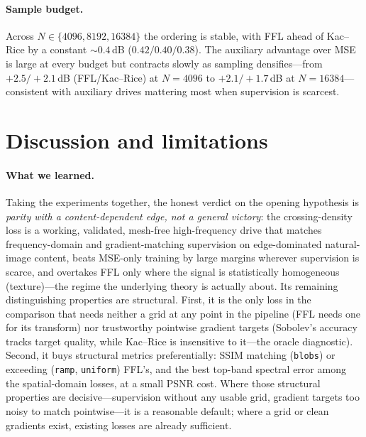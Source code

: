 \documentclass[10pt]{article}
\begin{document}
\paragraph{Sample budget.} Across $N\in\{4096, 8192, 16384\}$ the ordering is stable,
with FFL ahead of Kac--Rice by a constant ${\sim}0.4$\,dB ($0.42/0.40/0.38$). The
auxiliary advantage over MSE is large at every budget but contracts slowly as
sampling densifies---from $+2.5/+2.1$\,dB (FFL/Kac--Rice) at $N{=}4096$ to
$+2.1/+1.7$\,dB at $N{=}16384$---consistent with auxiliary drives mattering most
when supervision is scarcest.

\section{Discussion and limitations}
\label{sec:discussion}

\paragraph{What we learned.} Taking the experiments together, the honest verdict on
the opening hypothesis is \emph{parity with a content-dependent edge, not a general
victory}: the crossing-density loss is a working, validated, mesh-free high-frequency
drive that matches frequency-domain and gradient-matching supervision on
edge-dominated natural-image content, beats MSE-only training by large margins
wherever supervision is scarce, and overtakes FFL only where the signal is
statistically homogeneous (texture)---the regime the underlying theory is actually
about. Its remaining distinguishing properties are structural. First, it is the only loss in the comparison that needs
neither a grid at any point in the pipeline (FFL needs one for its transform) nor
trustworthy pointwise gradient targets (Sobolev's accuracy tracks target quality,
while Kac--Rice is insensitive to it---the oracle diagnostic). Second, it buys
structural metrics preferentially: SSIM matching (\texttt{blobs}) or exceeding
(\texttt{ramp}, \texttt{uniform}) FFL's, and the best top-band spectral error among
the spatial-domain losses, at a small PSNR cost. Where those structural properties are decisive---supervision without any usable
grid, gradient targets too noisy to match pointwise---it is a reasonable default;
where a grid or clean gradients exist, existing losses are already sufficient.
\end{document}
